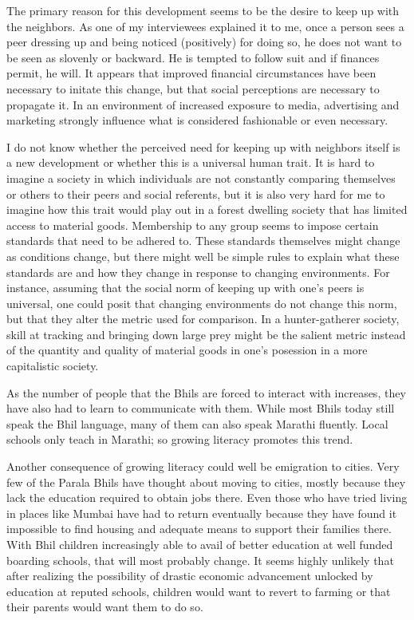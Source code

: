 \documentclass[report.tex]{subfiles}
\begin{document}
The primary reason for this development seems to be the desire to keep up with the neighbors. As one of my interviewees explained it to me, once a person sees a peer dressing up and being noticed (positively) for doing so, he does not want to be seen as slovenly or backward. He is tempted to follow suit and if finances permit, he will. It appears that improved financial circumstances have been necessary to initate this change, but that social perceptions are necessary to propagate it. In an environment of increased exposure to media, advertising and marketing strongly influence what is considered fashionable or even necessary.

I do not know whether the perceived need for keeping up with neighbors itself is a new development or whether this is a universal human trait. It is hard to imagine a society in which individuals are not constantly comparing themselves or others to their peers and social referents, but it is also very hard for me to imagine how this trait would play out in a forest dwelling society that has limited access to material goods. Membership to any group seems to impose certain standards that need to be adhered to. These standards themselves might change as conditions change, but there might well be simple rules to explain what these standards are and how they change in response to changing environments. For instance, assuming that the social norm of keeping up with one's peers is universal, one could posit that changing environments do not change this norm, but that they alter the metric used for comparison. In a hunter-gatherer society, skill at tracking and bringing down large prey might be the salient metric instead of the quantity and quality of material goods in one's posession in a more capitalistic society.

As the number of people that the Bhils are forced to interact with increases, they have also had to learn to communicate with them. While most Bhils today still speak the Bhil language, many of them can also speak Marathi fluently. Local schools only teach in Marathi; so growing literacy promotes this trend.

Another consequence of growing literacy could well be emigration to cities. Very few of the Parala Bhils have thought about moving to cities, mostly because they lack the education required to obtain jobs there. Even those who have tried living in places like Mumbai have had to return eventually because they have found it impossible to find housing and adequate means to support their families there. With Bhil children increasingly able to avail of better education at well funded boarding schools, that will most probably change. It seems highly unlikely that after realizing the possibility of drastic economic advancement unlocked by education at reputed schools, children would want to revert to farming or that their parents would want them to do so.
\end{document}
